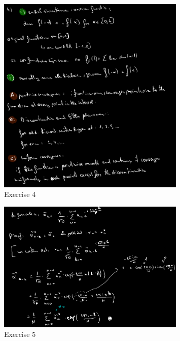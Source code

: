 \documentclass[a4paper]{report}
\begin{document}
\begin{figure}[H]
	\centering
	\includegraphics[width=0.8\textwidth]{assets/huis_9_ex_4.png}
	\caption{Exercise 4}
	\label{fig:huis_9_ex_4}
\end{figure}

\begin{figure}[H]
	\centering
	\includegraphics[width=0.8\textwidth]{assets/huis_9_ex_5.png}
	\caption{Exercise 5}
	\label{fig:huis_9_ex_5}
\end{figure}
\end{document}
